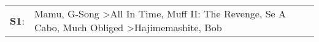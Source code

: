 \begin{supertabular}{p{0.03\textwidth}p{0.92\textwidth}}
 \textbf{S1}:  &  Mamu\textsuperscript{}, \enspace G-Song\textsuperscript{} \textgreater \enspace All In Time\textsuperscript{}, \enspace Muff II: The Revenge\textsuperscript{}, \enspace Se A Cabo\textsuperscript{}, \enspace Much Obliged\textsuperscript{} \textgreater \enspace Hajimemashite\textsuperscript{}, \enspace Bob\textsuperscript{}  \enspace  \\
\end{supertabular}
